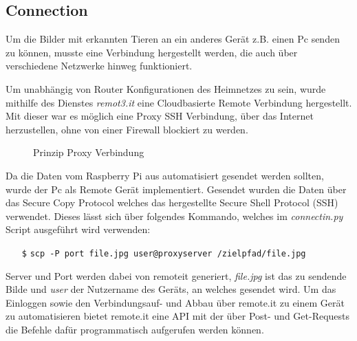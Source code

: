 \subsection*{Connection}

Um die Bilder mit erkannten Tieren an ein anderes Gerät 
z.B. einen Pc senden zu können, musste eine Verbindung
hergestellt werden, die auch über verschiedene Netzwerke 
hinweg funktioniert.

Um unabhängig von Router Konfigurationen des Heimnetzes zu sein, 
wurde mithilfe des Dienstes \textit{remot3.it} \cite{remoteit}
eine Cloudbasierte Remote Verbindung hergestellt.
Mit dieser war es möglich eine Proxy SSH Verbindung, 
über das Internet herzustellen, ohne von einer Firewall 
blockiert zu werden.


\begin{figure}[H]
    \centering
    \def\svgwidth{0.7\textwidth}
    
    \caption{Prinzip Proxy Verbindung}
    \label{fig:remoteit}
\end{figure}

Da die Daten vom Raspberry Pi aus automatisiert gesendet 
werden sollten, wurde der Pc als Remote Gerät implementiert.
Gesendet wurden die Daten über das Secure Copy Protocol welches 
das hergestellte Secure Shell Protocol (SSH) verwendet.
Dieses lässt sich über folgendes Kommando,
welches im \textit{connectin.py}
Script ausgeführt wird verwenden:
\begin{itemize}
    \item[\texttt{\$}] \texttt{scp -P port file.jpg user@proxyserver /zielpfad/file.jpg}
\end{itemize}

Server und Port werden dabei von remoteit generiert, \textit{file.jpg}
ist das zu sendende Bilde und \textit{user} der Nutzername des Geräts,
an welches gesendet wird.
Um das Einloggen sowie den Verbindungsauf- und Abbau 
über remote.it zu einem Gerät zu automatisieren
bietet remote.it eine API mit der über Post- und Get-Requests
die Befehle dafür programmatisch aufgerufen werden können.




 









% 

%         
%     
%     

